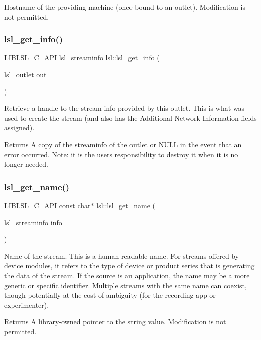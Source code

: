 Hostname of the providing machine (once bound to an outlet). Modification is not permitted. \mbox{\label{namespacelsl_add36e044b2c854296d26dbe429ef0445}} 
\subsubsection{\texorpdfstring{lsl\+\_\+get\+\_\+info()}{lsl\_get\_info()}}
{\footnotesize\ttfamily L\+I\+B\+L\+S\+L\+\_\+\+C\+\_\+\+A\+PI \hyperlink{namespacelsl_aa0a9ce9956061679949daa2e35aae2e8}{lsl\+\_\+streaminfo} lsl\+::lsl\+\_\+get\+\_\+info (\begin{DoxyParamCaption}\item[{\hyperlink{namespacelsl_abcf512b0f66dacf86c10b165995fd50b}{lsl\+\_\+outlet}}]{out }\end{DoxyParamCaption})}

Retrieve a handle to the stream info provided by this outlet. This is what was used to create the stream (and also has the Additional Network Information fields assigned). \begin{DoxyReturn}{Returns}
A copy of the streaminfo of the outlet or N\+U\+LL in the event that an error occurred. Note\+: it is the user\textquotesingle{}s responsibility to destroy it when it is no longer needed. 
\end{DoxyReturn}
\mbox{\label{namespacelsl_ad356f55776a73d03998837c5c32fc95e}} 
\subsubsection{\texorpdfstring{lsl\+\_\+get\+\_\+name()}{lsl\_get\_name()}}
{\footnotesize\ttfamily L\+I\+B\+L\+S\+L\+\_\+\+C\+\_\+\+A\+PI const char$\ast$ lsl\+::lsl\+\_\+get\+\_\+name (\begin{DoxyParamCaption}\item[{\hyperlink{namespacelsl_aa0a9ce9956061679949daa2e35aae2e8}{lsl\+\_\+streaminfo}}]{info }\end{DoxyParamCaption})}

Name of the stream. This is a human-\/readable name. For streams offered by device modules, it refers to the type of device or product series that is generating the data of the stream. If the source is an application, the name may be a more generic or specific identifier. Multiple streams with the same name can coexist, though potentially at the cost of ambiguity (for the recording app or experimenter). \begin{DoxyReturn}{Returns}
A library-\/owned pointer to the string value. Modification is not permitted. 
\end{DoxyReturn}
\mbox{\label{namespacelsl_a17e4e6d432dc0b7280df4b5365c7da46}} 
